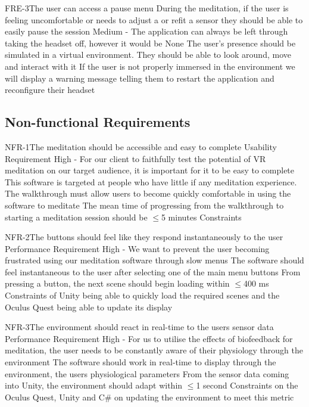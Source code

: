 \documentclass[coverpage,lineno]{../custom}
\begin{document}
\FunctionalReq
{FRE-3}{The user can access a pause menu}
{During the meditation, if the user is feeling uncomfortable or needs to adjust a or refit a sensor they should be able to easily pause the session}
{Medium - \shouldhave}
{The application can always be left through taking the headset off, however it would be}
{None}
{The user's presence should be simulated in a virtual environment. They should be able to look around, move and interact with it}
{If the user is not properly immersed in the environment we will display a warning message telling them to restart the application and reconfigure their headset}

\subsection{Non-functional Requirements}
\label{ssec:nf_req}


\NonFunctionalReq
{NFR-1}{The meditation should be accessible and easy to complete}
{Usability Requirement}
{High - For our client to faithfully test the potential of VR meditation on our target audience, it is important for it to be easy to complete}
{This software is targeted at people who have little if any meditation experience. The walkthrough must allow users to become quickly comfortable in using the software to meditate}
{The mean time of progressing from the walkthrough to starting a meditation session should be $\le$5 minutes}
{Constraints}

\NonFunctionalReq
{NFR-2}{The buttons should feel like they respond instantaneously to the user}
{Performance Requirement}
{High - We want to prevent the user becoming frustrated using our meditation software through slow menus}
{The software should feel instantaneous to the user after selecting one of the main menu buttons}
{From pressing a button, the next scene should begin loading within $\le$400 ms}
{Constraints of Unity being able to quickly load the required scenes and the Oculus Quest being able to update its display}

\NonFunctionalReqSec
{NFR-3}{The environment should react in real-time to the users sensor data}
{Performance Requirement}
{High - For us to utilise the effects of biofeedback for meditation, the user needs to be constantly aware of their physiology through the environment}
{The software should work in real-time to display through the environment, the users physiological parameters}
{From the sensor data coming into Unity, the environment should adapt within $\le$1 second}
{Constraints on the Oculus Quest, Unity and C\# on updating the environment to meet this metric}
\end{document}
